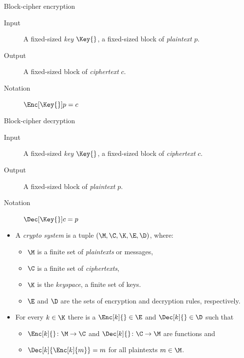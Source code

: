 \begin{frame}
  \begin{block}{Block-cipher encryption}
    \begin{description}
      \item[Input] A fixed-sized \emph{key} \(\Key{}\), a fixed-sized block of 
        \emph{plaintext} \(p\).
      \item[Output] A fixed-sized block of \emph{ciphertext} \(c\).
      \item[Notation] \(\Enc[\Key{}]{p} = c\)
    \end{description}
  \end{block}

  \pause{}

  \begin{block}{Block-cipher decryption}
    \begin{description}
      \item[Input] A fixed-sized \emph{key} \(\Key{}\), a fixed-sized block of 
        \emph{ciphertext} \(c\).
      \item[Output] A fixed-sized block of \emph{plaintext} \(p\).
      \item[Notation] \(\Dec[\Key{}]{c} = p\)
    \end{description}
  \end{block}
\end{frame}

\begin{frame}
  \begin{definition}\label{CryptoSystem}
    \begin{itemize}
        \item A \emph{crypto system} is a tuple \((\M, \C, \K, \E, \D)\), 
          where:
          \begin{itemize}
            \item \(\M\) is a finite set of \emph{plaintexts} or messages,
            \item \(\C\) is a finite set of \emph{ciphertexts},
            \item \(\K\) is the \emph{keyspace}, a finite set of keys.
            \item \(\E\) and \(\D\) are the sets of encryption and decryption
              rules, respectively.
          \end{itemize}

          \pause{}

        \item For every \(k\in \K\) there is a \(\Enc[k]{}\in \E\) and 
          \(\Dec[k]{}\in \D\) such that
          \begin{itemize}
            \item \(\Enc[k]{}\colon \M\to \C\) and \(\Dec[k]{}\colon \C\to 
                \M\) are functions and
            \item \(\Dec[k]{\Enc[k]{m}} = m\) for all plaintexts \(m\in 
                \M\).
          \end{itemize}
      \end{itemize}
  \end{definition}
\end{frame}

